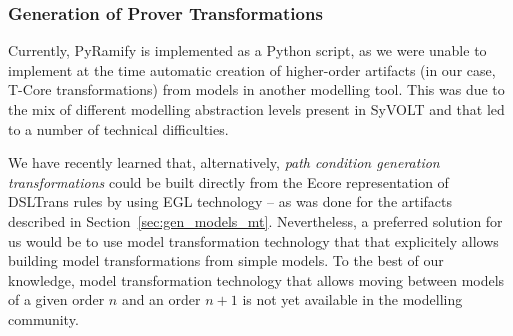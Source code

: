 \subsubsection{Generation of Prover Transformations}

Currently, PyRamify is implemented as a Python script, as we were unable to
implement at the time automatic creation of higher-order artifacts (in our
case, T-Core transformations) from models in another modelling tool.
This was due to the mix of different modelling abstraction levels present in
SyVOLT and that led to a number of technical difficulties.

We have recently learned that, alternatively, \emph{path condition generation
transformations} could be built directly from the Ecore representation of
DSLTrans rules by using EGL technology -- as was done for the artifacts
described in Section~\ref{sec:gen_models_mt}. Nevertheless, a preferred solution
for us would be to use model transformation technology that that explicitely
allows building model transformations from simple models. To the best of our
knowledge, model transformation technology that allows moving between models of
a given order $n$ and an order $n+1$ is not yet available in the modelling
community.
